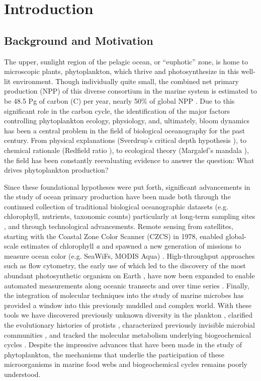 
\chapter{Introduction}
\raggedbottom
\clearpage
\section{Background and Motivation}
The upper, sunlight region of the pelagic ocean, or ``euphotic'' zone, is home to microscopic plants, phytoplankton, which thrive and photosynthesize in this well-lit environment. Though individually quite small, the combined net primary production (NPP) of this diverse consortium in the marine system is estimated to be 48.5 Pg of carbon (C) per year, nearly 50\% of global NPP \citep{Longhurst1995, Field1998}. Due to this significant role in the carbon cycle, the identification of the major factors controlling phytoplankton ecology, physiology, and, ultimately, bloom dynamics has been a central problem in the field of biological oceanography for the past century. From physical explanations (Sverdrup's critical depth hypothesis \citeyearpar{Sverdrup1953}), to chemical rationale (Redfield ratio \citeyearpar{Redfield1958}), to ecological theory (Margalef's mandala \citeyearpar{Margalef1978}), the field has been constantly reevaluating evidence to answer the question: What drives phytoplankton production?\par

Since these foundational hypotheses were put forth, significant advancements in the study of ocean primary production have been made both through the continued collection of traditional biological oceanographic datasets (e.g. chlorophyll, nutrients, taxonomic counts) particularly at long-term sampling sites \citep{Karl1996, Steinberg2001,Smith2003, Li1998}, and through technological advancements. Remote sensing from satellites, starting with the Coastal Zone Color Scanner (CZCS) in 1978, enabled global-scale estimates of chlorophyll \textit{a} and spawned a new generation of missions to measure ocean color (e.g. SeaWiFs, MODIS Aqua) \citep{McClain2009}. High-throughput approaches such as flow cytometry, the early use of which led to the discovery of the most abundant photosynthetic organism on Earth \citep{Chisholm1988}, have now been expanded to enable automated measurements along oceanic transects \citep{Swalwell2011, Ribalet2015} and over time series \citep{Olson2003}. Finally, the integration of molecular techniques into the study of marine microbes has provided a window into this previously muddled and complex world. With these tools we have discovered previously unknown diversity in the plankton \citep{Lopez-Garcia2001}, clarified the evolutionary histories of protists \citep{Keeling2005}, characterized previously invisible microbial communities \citep{Fuhrman1993}, and tracked the molecular metabolism underlying biogeochemical cycles \citep{Konneke2005}. Despite the impressive advances that have been made in the study of phytoplankton, the mechanisms that underlie the participation of these microorganisms in marine food webs and biogeochemical cycles remains poorly understood. \par

